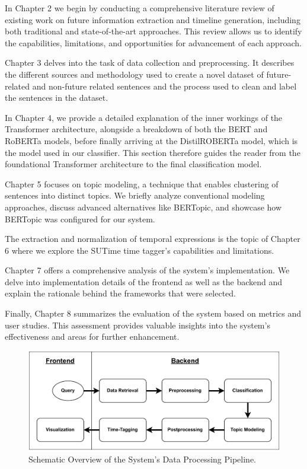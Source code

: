 \documentclass[a4paper,10pt]{report} %
\begin{document}
In Chapter 2 we begin by conducting a comprehensive literature review of existing work on future information extraction and timeline generation, including both traditional and state-of-the-art approaches. This review allows us to identify the capabilities, limitations, and opportunities for advancement of each approach.

Chapter 3 delves into the task of data collection and preprocessing. It describes the different sources and methodology used to create a novel dataset of future-related and non-future related sentences and the process used to clean and label the sentences in the dataset.

In Chapter 4, we provide a detailed explanation of the inner workings of the Transformer architecture, alongside a breakdown of both the BERT and RoBERTa models, before finally arriving at the DistilROBERTa model, which is the model used in our classifier. This section therefore guides the reader from the foundational Transformer architecture to the final classification model.

Chapter 5 focuses on topic modeling, a technique that enables clustering of sentences into distinct topics. We briefly analyze conventional modeling approaches, discuss advanced alternatives like BERTopic, and showcase how BERTopic was configured for our system.

The extraction and normalization of temporal expressions is the topic of Chapter 6 where we explore the SUTime time tagger's capabilities and limitations.

Chapter 7 offers a comprehensive analysis of the system's implementation. We delve into implementation details of the frontend as well as the backend and explain the rationale behind the frameworks that were selected.

Finally, Chapter 8 summarizes the evaluation of the system based on metrics and user studies. This assessment provides valuable insights into the system's effectiveness and areas for further enhancement.

\begin{figure}[H]
\centering
\includegraphics[width=13cm]{img/system.pdf}
\caption{Schematic Overview of the System's Data Processing Pipeline.}
\label{fig:archi}
\end{figure}
\end{document}
